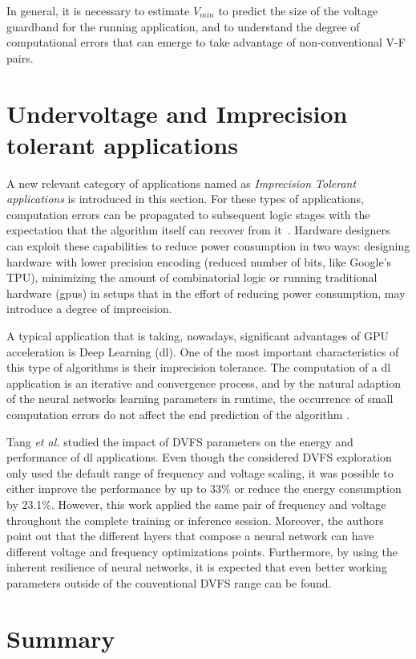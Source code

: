 In general, it is necessary to estimate $V_{min}$ to predict the size of the voltage guardband for the running application, and to understand the degree of computational errors that can emerge to take advantage of non-conventional V-F pairs.

\section{Undervoltage and Imprecision tolerant applications}

A new relevant category of applications named as \textit{Imprecision Tolerant applications} is introduced in this section. For these types of applications, computation errors can be propagated to subsequent logic stages with the expectation that the algorithm itself can recover from it~\cite{nakhaee_lifetime_2018}. Hardware designers can exploit these capabilities to reduce power consumption in two ways: designing hardware with lower precision encoding (reduced number of bits, like Google's TPU), minimizing the amount of combinatorial logic or running traditional hardware (\acrshort{gpu}s) in setups that in the effort of reducing power consumption, may introduce a degree of imprecision.

A typical application that is taking, nowadays, significant advantages of GPU acceleration is Deep Learning (\acrshort{dl}). One of the most important characteristics of this type of algorithms is their imprecision tolerance. The computation of a \acrshort{dl} application is an iterative and convergence process, and by the natural adaption of the neural networks learning parameters in runtime, the occurrence of small computation errors do not affect the end prediction of the algorithm \cite{jiao_assessment_2017}.

Tang \textit{et al.} \cite{tang_impact_2019} studied the impact of DVFS parameters on the energy and performance of \acrshort{dl} applications. Even though the considered DVFS exploration only used the default range of frequency and voltage scaling, it was possible to either improve the performance by up to 33\% or reduce the energy consumption by 23.1\%. However, this work applied the same pair of frequency and voltage throughout the complete training or inference session. Moreover, the authors point out that the different layers that compose a neural network can have different voltage and frequency optimizations points. Furthermore, by using the inherent resilience of neural networks, it is expected that even better working parameters outside of the conventional DVFS range can be found. 

\section{Summary}